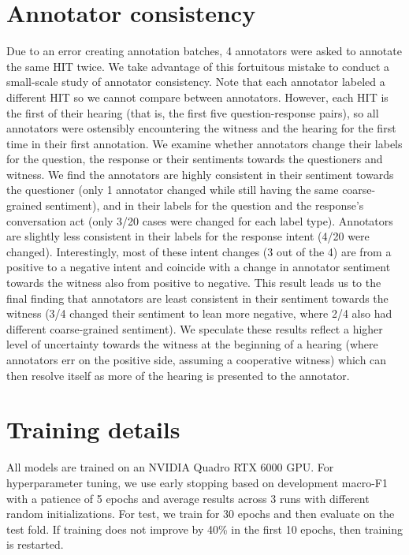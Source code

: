 \section{Annotator consistency}
\label{sec:app_consistency}
Due to an error creating annotation batches, 4 annotators were asked to annotate the same HIT twice. We take advantage of this fortuitous mistake to conduct a small-scale study of annotator consistency. Note that each annotator labeled a different HIT so we cannot compare between annotators. However, each HIT is the first of their hearing (that is, the first five question-response pairs), so all annotators were ostensibly encountering the witness and the hearing for the first time in their first annotation. We examine whether annotators change their labels for the question, the response or their sentiments towards the questioners and witness. We find the annotators are highly consistent in their sentiment towards the questioner (only 1 annotator changed while still having the same coarse-grained sentiment), and in their labels for the question and the response's conversation act (only 3/20 cases were changed for each label type). Annotators are slightly less consistent in their labels for the response intent (4/20 were changed). Interestingly, most of these intent changes (3 out of the 4) are from a positive to a negative intent and coincide with a change in annotator sentiment towards the witness also from positive to negative. This result leads us to the final finding that annotators are least consistent in their sentiment towards the witness (3/4 changed their sentiment to lean more negative, where 2/4 also had different coarse-grained sentiment). We speculate these results reflect a higher level of uncertainty towards the witness at the beginning of a hearing (where annotators err on the positive side, assuming a cooperative witness) which can then resolve itself as more of the hearing is presented to the annotator. 

\section{Training details}
\label{sec:app_training}

All models are trained on an NVIDIA Quadro RTX 6000 GPU. For hyperparameter tuning, we use early stopping based on development macro-F1 with a patience of 5 epochs and average results across 3 runs with different random initializations. For test, we train for 30 epochs and then evaluate on the test fold. If training does not improve by 40\% in the first 10 epochs, then training is restarted.

